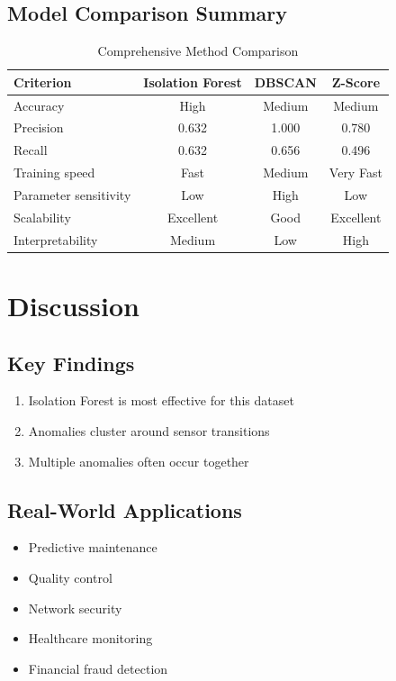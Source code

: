 \documentclass[12pt,a4paper]{report}
\begin{document}
\section{Model Comparison Summary}

\begin{table}[H]
\centering
\caption{Comprehensive Method Comparison}
\begin{tabular}{lccc}
\toprule
\textbf{Criterion} & \textbf{Isolation Forest} & \textbf{DBSCAN} & \textbf{Z-Score} \\
\midrule
Accuracy & High & Medium & Medium \\
Precision & 0.632 & 1.000 & 0.780 \\
Recall & 0.632 & 0.656 & 0.496 \\
Training speed & Fast & Medium & Very Fast \\
Parameter sensitivity & Low & High & Low \\
Scalability & Excellent & Good & Excellent \\
Interpretability & Medium & Low & High \\
\bottomrule
\end{tabular}
\end{table}

\chapter{Discussion}

\section{Key Findings}
\begin{enumerate}
    \item Isolation Forest is most effective for this dataset
    \item Anomalies cluster around sensor transitions
    \item Multiple anomalies often occur together
\end{enumerate}

\section{Real-World Applications}
\begin{itemize}
    \item Predictive maintenance
    \item Quality control
    \item Network security
    \item Healthcare monitoring
    \item Financial fraud detection
\end{itemize}
\end{document}
